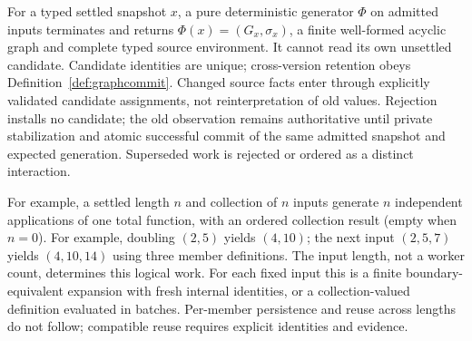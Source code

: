 \begin{definition}\label{def:dynamic-generation}
For a typed settled snapshot $x$, a pure deterministic generator $\Phi$ on admitted inputs terminates and returns $\Phi(x)=(G_x,\sigma_x)$, a finite well-formed acyclic graph and complete typed source environment. It cannot read its own unsettled candidate. Candidate identities are unique; cross-version retention obeys Definition~\ref{def:graphcommit}. Changed source facts enter through explicitly validated candidate assignments, not reinterpretation of old values. Rejection installs no candidate; the old observation remains authoritative until private stabilization and atomic successful commit of the same admitted snapshot and expected generation. Superseded work is rejected or ordered as a distinct interaction.
\end{definition}
For example, a settled length $n$ and collection of $n$ inputs generate $n$ independent applications of one total function, with an ordered collection result (empty when $n=0$). For example, doubling $(2,5)$ yields $(4,10)$; the next input $(2,5,7)$ yields $(4,10,14)$ using three member definitions. The input length, not a worker count, determines this logical work. For each fixed input this is a finite boundary-equivalent expansion with fresh internal identities, or a collection-valued definition evaluated in batches. Per-member persistence and reuse across lengths do not follow; compatible reuse requires explicit identities and evidence.

